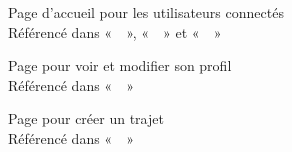 \begin{figure}
    \caption[Page d'accueil pour les utilisateurs connectés]{Page d'accueil pour les utilisateurs connectés\\Référencé dans «~~», «~~» et «~~»}
    \centering
    \label{fig:Accueil - Connecté}
\end{figure}

\begin{figure}
    \caption[Page pour voir et modifier son profil]{Page pour voir et modifier son profil\\Référencé dans «~~»}
    \centering
    \label{fig:Profil}
\end{figure}

\begin{figure}
    \caption[Page pour créer un trajet]{Page pour créer un trajet\\Référencé dans «~~»}
    \centering
    \label{fig:Proposer un trajet}
\end{figure}

